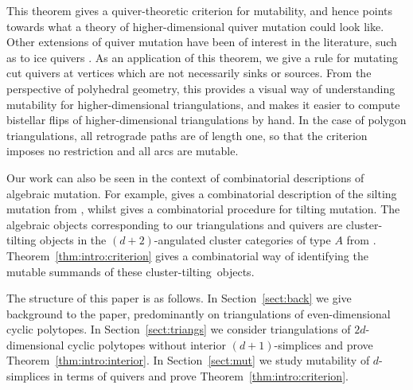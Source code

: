 \documentclass[ALCO,Unicode,published]{cedram}
\begin{document}
This theorem gives a quiver-theoretic criterion for mutability, and hence points towards what a theory of higher-dimensional quiver mutation \cite{fz2} could look like. Other extensions of quiver mutation have been of interest in the literature, such as to ice quivers \cite{press_frozen}. As an application of this theorem, we give a rule for mutating cut quivers at vertices which are not necessarily sinks or sources. From the perspective of polyhedral geometry, this provides a visual way of understanding mutability for higher-dimensional triangulations, and makes it easier to compute bistellar flips of higher-dimensional triangulations by hand. In the case of polygon triangulations, all retrograde paths are of length one, so that the criterion imposes no restriction and all arcs are mutable.

Our work can also be seen in the context of combinatorial descriptions of algebraic mutation. For example, \cite{opp_silt} gives a combinatorial description of the silting mutation from \cite{ai}, whilst \cite{fosse_tilt} gives a combinatorial procedure for tilting mutation. The algebraic objects corresponding to our triangulations and quivers are cluster-tilting objects in the $(d + 2)$-angulated cluster categories of type $A$ from \cite{ot}. Theorem~\ref{thm:intro:criterion} gives a combinatorial way of identifying the mutable summands of these cluster-tilting~objects.

The structure of this paper is as follows. In Section~\ref{sect:back} we give background to the paper, predominantly on triangulations of even-dimensional cyclic polytopes. In Section~\ref{sect:triangs} we consider triangulations of $2d$-dimensional cyclic polytopes without interior $(d + 1)$-simplices and prove Theorem~\ref{thm:intro:interior}. In Section~\ref{sect:mut} we study mutability of $d$-simplices in terms of quivers and prove Theorem~\ref{thm:intro:criterion}.
\end{document}
